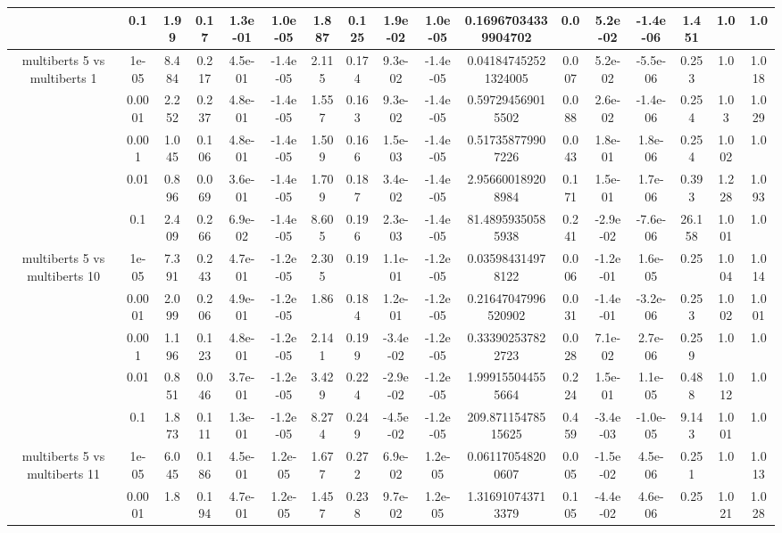 \begin{tabular}{|c|c|c|c|c|c|c|c|c|c|c|c|c|c|c|c|c|}
 & 0.1 & 1.99 & 0.17 & 1.3e-01 & 1.0e-05 & 1.887 & 0.125 & 1.9e-02 & 1.0e-05 & 0.16967034339904702 & 0.0 & 5.2e-02 & -1.4e-06 & 1.451 & 1.0 & 1.0 \\
\hline
\multirow{5}{*}{multiberts 5 vs multiberts 1} & 1e-05 & 8.484 & 0.217 & 4.5e-01 & -1.4e-05 & 2.115 & 0.174 & 9.3e-02 & -1.4e-05 & 0.041847452521324005 & 0.007 & 5.2e-02 & -5.5e-06 & 0.253 & 1.0 & 1.018 \\
 & 0.0001 & 2.252 & 0.237 & 4.8e-01 & -1.4e-05 & 1.557 & 0.163 & 9.3e-02 & -1.4e-05 & 0.597294569015502 & 0.088 & 2.6e-02 & -1.4e-06 & 0.254 & 1.03 & 1.029 \\
 & 0.001 & 1.045 & 0.106 & 4.8e-01 & -1.4e-05 & 1.509 & 0.166 & 1.5e-03 & -1.4e-05 & 0.517358779907226 & 0.043 & 1.8e-01 & 1.8e-06 & 0.254 & 1.002 & 1.0 \\
 & 0.01 & 0.896 & 0.069 & 3.6e-01 & -1.4e-05 & 1.709 & 0.187 & 3.4e-02 & -1.4e-05 & 2.956600189208984 & 0.171 & 1.5e-01 & 1.7e-06 & 0.393 & 1.228 & 1.093 \\
 & 0.1 & 2.409 & 0.266 & 6.9e-02 & -1.4e-05 & 8.605 & 0.196 & 2.3e-03 & -1.4e-05 & 81.48959350585938 & 0.241 & -2.9e-02 & -7.6e-06 & 26.158 & 1.001 & 1.0 \\
\hline
\multirow{5}{*}{multiberts 5 vs multiberts 10} & 1e-05 & 7.391 & 0.243 & 4.7e-01 & -1.2e-05 & 2.305 & 0.19 & 1.1e-01 & -1.2e-05 & 0.035984314978122 & 0.006 & -1.2e-01 & 1.6e-05 & 0.25 & 1.004 & 1.014 \\
 & 0.0001 & 2.099 & 0.206 & 4.9e-01 & -1.2e-05 & 1.86 & 0.184 & 1.2e-01 & -1.2e-05 & 0.21647047996520902 & 0.031 & -1.4e-01 & -3.2e-06 & 0.253 & 1.002 & 1.001 \\
 & 0.001 & 1.196 & 0.123 & 4.8e-01 & -1.2e-05 & 2.141 & 0.199 & -3.4e-02 & -1.2e-05 & 0.333902537822723 & 0.028 & 7.1e-02 & 2.7e-06 & 0.259 & 1.0 & 1.0 \\
 & 0.01 & 0.851 & 0.046 & 3.7e-01 & -1.2e-05 & 3.429 & 0.224 & -2.9e-02 & -1.2e-05 & 1.999155044555664 & 0.224 & 1.5e-01 & 1.1e-05 & 0.488 & 1.012 & 1.0 \\
 & 0.1 & 1.873 & 0.111 & 1.3e-01 & -1.2e-05 & 8.274 & 0.249 & -4.5e-02 & -1.2e-05 & 209.87115478515625 & 0.459 & -3.4e-03 & -1.0e-05 & 9.143 & 1.001 & 1.0 \\
\hline
\multirow{5}{*}{multiberts 5 vs multiberts 11} & 1e-05 & 6.045 & 0.186 & 4.5e-01 & 1.2e-05 & 1.677 & 0.272 & 6.9e-02 & 1.2e-05 & 0.061170548200607 & 0.005 & -1.5e-02 & 4.5e-06 & 0.251 & 1.0 & 1.013 \\
 & 0.0001 & 1.8 & 0.194 & 4.7e-01 & 1.2e-05 & 1.457 & 0.238 & 9.7e-02 & 1.2e-05 & 1.316910743713379 & 0.105 & -4.4e-02 & 4.6e-06 & 0.25 & 1.021 & 1.028 \\

\end{tabular}
